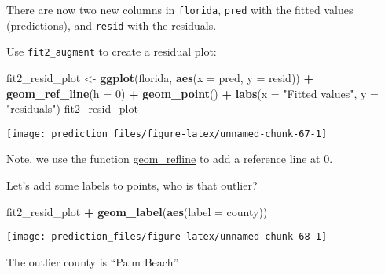 \documentclass[]{book}
\newenvironment{Shaded}{\begin{snugshade}}{\end{snugshade}}
\newcommand{\CommentTok}[1]{\textcolor[rgb]{0.56,0.35,0.01}{\textit{#1}}}
\newcommand{\DataTypeTok}[1]{\textcolor[rgb]{0.13,0.29,0.53}{#1}}
\newcommand{\DecValTok}[1]{\textcolor[rgb]{0.00,0.00,0.81}{#1}}
\newcommand{\KeywordTok}[1]{\textcolor[rgb]{0.13,0.29,0.53}{\textbf{#1}}}
\newcommand{\NormalTok}[1]{#1}
\newcommand{\OperatorTok}[1]{\textcolor[rgb]{0.81,0.36,0.00}{\textbf{#1}}}
\newcommand{\StringTok}[1]{\textcolor[rgb]{0.31,0.60,0.02}{#1}}
\theoremstyle{definition}
\theoremstyle{definition}
\theoremstyle{definition}
\theoremstyle{remark}
\begin{document}
There are now two new columns in \texttt{florida}, \texttt{pred} with
the fitted values (predictions), and \texttt{resid} with the residuals.

Use \texttt{fit2\_augment} to create a residual plot:

\begin{Shaded}
\begin{Highlighting}[]
\NormalTok{fit2_resid_plot <-}
\StringTok{  }\KeywordTok{ggplot}\NormalTok{(florida, }\KeywordTok{aes}\NormalTok{(}\DataTypeTok{x =}\NormalTok{ pred, }\DataTypeTok{y =}\NormalTok{ resid)) }\OperatorTok{+}
\StringTok{  }\KeywordTok{geom_ref_line}\NormalTok{(}\DataTypeTok{h =} \DecValTok{0}\NormalTok{) }\OperatorTok{+}
\StringTok{  }\KeywordTok{geom_point}\NormalTok{() }\OperatorTok{+}
\StringTok{  }\KeywordTok{labs}\NormalTok{(}\DataTypeTok{x =} \StringTok{"Fitted values"}\NormalTok{, }\DataTypeTok{y =} \StringTok{"residuals"}\NormalTok{)}
\NormalTok{fit2_resid_plot}
\end{Highlighting}
\end{Shaded}

\begin{center}\texttt{[image: prediction\_files/figure-latex/unnamed-chunk-67-1]} \end{center}

Note, we use the function
\href{https://www.rdocumentation.org/packages/modelr/topics/geom_refline}{geom\_refline}
to add a reference line at 0.

Let's add some labels to points, who is that outlier?

\begin{Shaded}
\begin{Highlighting}[]
\NormalTok{fit2_resid_plot }\OperatorTok{+}
\StringTok{  }\KeywordTok{geom_label}\NormalTok{(}\KeywordTok{aes}\NormalTok{(}\DataTypeTok{label =}\NormalTok{ county))}
\end{Highlighting}
\end{Shaded}

\begin{center}\texttt{[image: prediction\_files/figure-latex/unnamed-chunk-68-1]} \end{center}

The outlier county is ``Palm Beach''

\begin{Shaded}
\end{Shaded}
\end{document}
